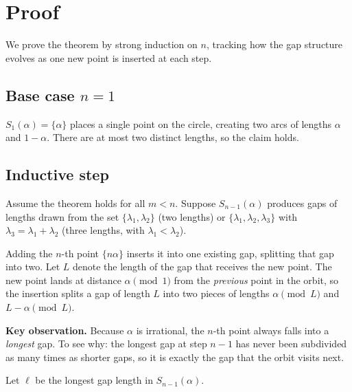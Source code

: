 \section*{Proof}

We prove the theorem by strong induction on $n$, tracking how the gap structure
evolves as one new point is inserted at each step.

\subsection*{Base case $n = 1$}

$S_1(\alpha) = \{\alpha\}$ places a single point on the circle, creating two
arcs of lengths $\alpha$ and $1 - \alpha$. There are at most two distinct
lengths, so the claim holds.

\subsection*{Inductive step}

Assume the theorem holds for all $m < n$. Suppose $S_{n-1}(\alpha)$ produces
gaps of lengths drawn from the set $\{\lambda_1, \lambda_2\}$ (two lengths) or
$\{\lambda_1, \lambda_2, \lambda_3\}$ with $\lambda_3 = \lambda_1 + \lambda_2$
(three lengths, with $\lambda_1 < \lambda_2$).

Adding the $n$-th point $\{n\alpha\}$ inserts it into one existing gap, splitting
that gap into two. Let $L$ denote the length of the gap that receives the new
point. The new point lands at distance $\alpha \pmod{1}$ from the \emph{previous}
point in the orbit, so the insertion splits a gap of length $L$ into two pieces
of lengths $\alpha \pmod{L}$ and $L - \alpha \pmod{L}$.

\medskip
\noindent\textbf{Key observation.} Because $\alpha$ is irrational, the
$n$-th point always falls into a \emph{longest} gap. To see why: the longest
gap at step $n-1$ has never been subdivided as many times as shorter gaps, so it
is exactly the gap that the orbit visits next.

\medskip
Let $\ell$ be the longest gap length in $S_{n-1}(\alpha)$.

